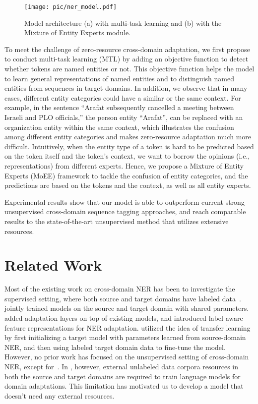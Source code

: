 \documentclass[11pt,a4paper]{article}
\begin{document}
\begin{figure*}[!t]
    \centering
    \texttt{[image: pic/ner\_model.pdf]}
    \caption{Model architecture (a) with multi-task learning and (b) with the Mixture of Entity Experts module.}
    \label{fig:model}
\end{figure*}

To meet the challenge of zero-resource cross-domain adaptation, we first propose to conduct multi-task learning (MTL) by adding an objective function to detect whether tokens are named entities or not. This objective function helps the model to learn general representations of named entities and to distinguish named entities from sequences in target domains.
In addition, we observe that in many cases, different entity categories could have a similar or the same context.
For example, in the sentence ``Arafat subsequently cancelled a meeting between Israeli and PLO officials,'' the person entity ``Arafat'', can be replaced with an organization entity within the same context, which illustrates the confusion among different entity categories and makes zero-resource adaptation much more difficult. 
Intuitively, when the entity type of a token is hard to be predicted based on the token itself and the token's context, we want to borrow the opinions (i.e., representations) from different experts. Hence, we propose a Mixture of Entity Experts (MoEE) framework to tackle the confusion of entity categories, and the predictions are based on the tokens and the context, as well as all entity experts. 

Experimental results show that our model is able to outperform current strong unsupervised cross-domain sequence tagging approaches, and reach comparable results to the state-of-the-art unsupervised method that utilizes extensive resources.

\section{Related Work}
Most of the existing work on cross-domain NER has been to investigate the supervised setting, where both source and target domains have labeled data~\cite{daume2007frustratingly,Obeidat2016LabelEA,yang2017transfer,lee2018transfer}. \citet{yang2017transfer} jointly trained models on the source and target domain with shared parameters. \citet{lin2018neural} added adaptation layers on top of existing models, and \citet{wang2018label} introduced label-aware feature representations for NER adaptation. \citet{lee2018transfer} utilized the idea of transfer learning by first initializing a target model with parameters learned from source-domain NER, and then using labeled target domain data to fine-tune the model. 
However, no prior work has focused on the unsupervised setting of cross-domain NER, except for~\citet{jia2019cross}. In \citet{jia2019cross}, however, external unlabeled data corpora resources in both the source and target domains are required to train language models for domain adaptations. This limitation has motivated us to develop a model that doesn't need any external resources.
\end{document}
